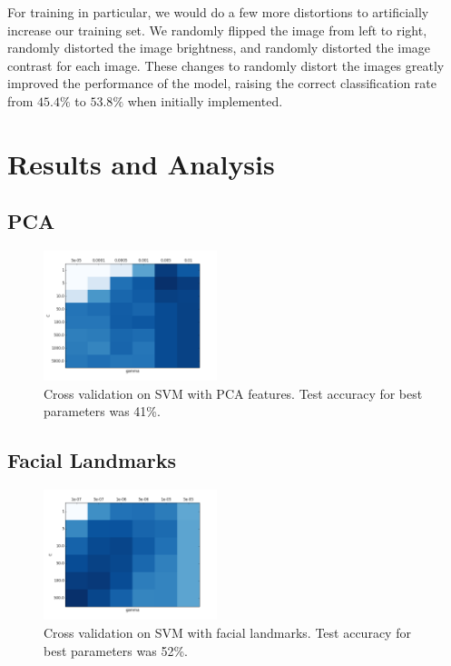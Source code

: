 \documentclass[11pt, twocolumn, twoside]{article}
\begin{document}
For training in particular, we would do a few more distortions to artificially increase our training set. We randomly flipped the image from left to right, randomly distorted the image brightness, and 	randomly distorted the image contrast for each image. These changes to randomly distort the images greatly improved the performance of the model, raising the correct classification rate from $45.4\%$ to $53.8\%$ when initially implemented.

\section{Results and Analysis}

\subsection{PCA}

\begin{figure}
\centering
\includegraphics[width=0.45\textwidth]{grid_search_pca}
\caption{\label{fig:grid_pca} Cross validation on SVM with PCA features. Test accuracy for best
parameters was 41\%.}
\end{figure}

\subsection{Facial Landmarks}

\begin{figure}
\centering
\includegraphics[width=0.45\textwidth]{grid_search_landmarks}
\caption{\label{fig:grid_pca} Cross validation on SVM with facial landmarks. Test accuracy for best
parameters was 52\%.}
\end{figure}
\end{document}
